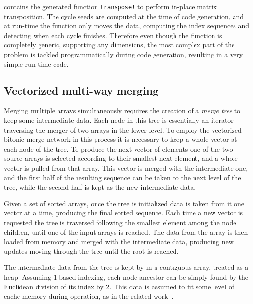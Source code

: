 \documentclass{juliacon}
\begin{document}
\chipsort contains the generated function \href{https://github.com/nlw0/ChipSort.jl/blob/10eb1a962e720aee2bf8733c832468b51a782c1a/src/transpose-vecs.jl#L19}{\tt transpose!} to perform in-place matrix transposition. The cycle seeds are computed at the time of code generation, and at run-time the function only moves the data, computing the index sequences and detecting when each cycle finishes. Therefore even though the function is completely generic, supporting any dimensions, the most complex part of the problem is tackled programmatically during code generation, resulting in a very simple run-time code.

\subsection{Vectorized multi-way merging}
%
Merging multiple arrays simultaneously requires the creation of a {\em merge tree} to keep some intermediate data. Each node in this tree is essentially an iterator traversing the merger of two arrays in the lower level. To employ the vectorized bitonic merge network in this process it is necessary to keep a whole vector at each node of the tree. To produce the next vector of elements one of the two source arrays is selected according to their smallest next element, and a whole vector is pulled from that array. This vector is merged with the intermediate one, and the first half of the resulting sequence can be taken to the next level of the tree, while the second half is kept as the new intermediate data.

Given a set of sorted arrays, once the tree is initialized data is taken from it one vector at a time, producing the final sorted sequence. Each time a new vector is requested the tree is traversed following the smallest element among the node children, until one of the input arrays is reached. The data from the array is then loaded from memory and merged with the intermediate data, producing new updates moving through the tree until the root is reached.

The intermediate data from the tree is kept by \chipsort in a contiguous array, treated as a heap. Assuming 1-based indexing, each node ancestor can be simply found by the Euclidean division of its index by 2. This data is assumed to fit some level of cache memory during operation, as in the related work~\cite{DBLP:conf/IEEEpact/InoueMKN07,DBLP:journals/pvldb/ChhuganiNLMHCBKD08,DBLP:journals/pvldb/InoueT15}.
\end{document}
